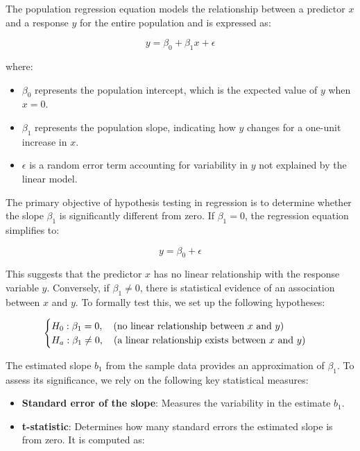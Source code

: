 \documentclass[
  11pt,
]{book}
\providecommand{\tightlist}{%
  \setlength{\itemsep}{0pt}\setlength{\parskip}{0pt}}
\theoremstyle{definition}
\theoremstyle{definition}
\theoremstyle{definition}
\theoremstyle{definition}
\theoremstyle{remark}
\begin{document}
The population regression equation models the relationship between a predictor \(x\) and a response \(y\) for the entire population and is expressed as:

\[
y = \beta_0 + \beta_1x + \epsilon
\]

where:

\begin{itemize}
\tightlist
\item
  \(\beta_0\) represents the population intercept, which is the expected value of \(y\) when \(x = 0\).\\
\item
  \(\beta_1\) represents the population slope, indicating how \(y\) changes for a one-unit increase in \(x\).\\
\item
  \(\epsilon\) is a random error term accounting for variability in \(y\) not explained by the linear model.
\end{itemize}

The primary objective of hypothesis testing in regression is to determine whether the slope \(\beta_1\) is significantly different from zero. If \(\beta_1 = 0\), the regression equation simplifies to:

\[
y = \beta_0 + \epsilon
\]

This suggests that the predictor \(x\) has no linear relationship with the response variable \(y\). Conversely, if \(\beta_1 \neq 0\), there is statistical evidence of an association between \(x\) and \(y\). To formally test this, we set up the following hypotheses:

\[
\begin{cases}
  H_0: \beta_1 =  0, \quad \text{(no linear relationship between \( x \) and \( y \))}  \\
  H_a: \beta_1 \neq 0, \quad \text{(a linear relationship exists between \( x \) and \( y \))}
\end{cases}
\]

The estimated slope \(b_1\) from the sample data provides an approximation of \(\beta_1\). To assess its significance, we rely on the following key statistical measures:

\begin{itemize}
\tightlist
\item
  \textbf{Standard error of the slope}: Measures the variability in the estimate \(b_1\).\\
\item
  \textbf{t-statistic}: Determines how many standard errors the estimated slope is from zero. It is computed as:
\end{itemize}
\end{document}
